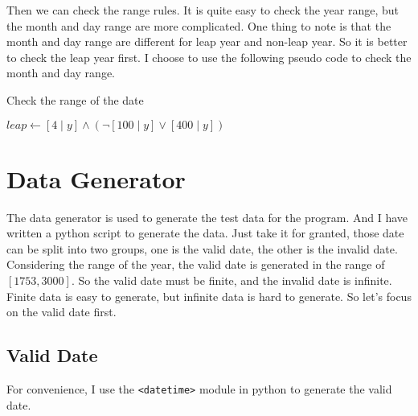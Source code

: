 \documentclass[a4paper,12pt]{article} %
\begin{document}
\newpage

Then we can check the range rules. 
It is quite easy to check the year range, 
but the month and day range are more complicated. 
One thing to note is that the month and day range are different for leap year and non-leap year.
So it is better to check the leap year first.
I choose to use the following pseudo code to check the month and day range. 


\begin{algorithm}
    \caption{Check the range of the date}
	\SetAlgoLined
    $leap \gets [4 \mid y] \land (\neg [100 \mid y] \lor [400 \mid y])$ \\

     {
    }
     {
         {
        }
    }  {
         {
        }
    }  {
         {
        }
    } 

\end{algorithm}


\section{Data Generator}

The data generator is used to generate the test data for the program. 
And I have written a python script to generate the data. 
Just take it for granted, those date can be split into two groups,
one is the valid date, the other is the invalid date.
Considering the range of the year, the valid date is generated in the range of $[1753, 3000]$. 
So the valid date must be finite, and the invalid date is infinite. 
Finite data is easy to generate, but infinite data is hard to generate.
So let's focus on the valid date first.

\subsection*{Valid Date}

For convenience, I use the \texttt{<datetime>} module in python to generate the valid date. 
\end{document}
